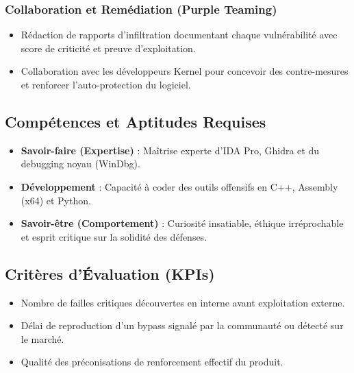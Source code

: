 \documentclass[12pt,a4paper]{article}
\begin{document}
\subsubsection{Collaboration et Remédiation (Purple Teaming)}
\begin{itemize}[label=\textbullet]
    \item Rédaction de rapports d'infiltration documentant chaque vulnérabilité avec score de criticité et preuve d'exploitation.
    \item Collaboration avec les développeurs Kernel pour concevoir des contre-mesures et renforcer l'auto-protection du logiciel.
\end{itemize}

\subsection{Compétences et Aptitudes Requises}
\begin{itemize}[label=\textbullet]
    \item \textbf{Savoir-faire (Expertise)} : Maîtrise experte d'IDA Pro, Ghidra et du debugging noyau (WinDbg).
    \item \textbf{Développement} : Capacité à coder des outils offensifs en C++, Assembly (x64) et Python.
    \item \textbf{Savoir-être (Comportement)} : Curiosité insatiable, éthique irréprochable et esprit critique sur la solidité des défenses.
\end{itemize}

\subsection{Critères d'Évaluation (KPIs)}
\begin{itemize}[label=\textbullet]
    \item Nombre de failles critiques découvertes en interne avant exploitation externe.
    \item Délai de reproduction d'un bypass signalé par la communauté ou détecté sur le marché.
    \item Qualité des préconisations de renforcement effectif du produit.
\end{itemize}

\newpage
\end{document}
